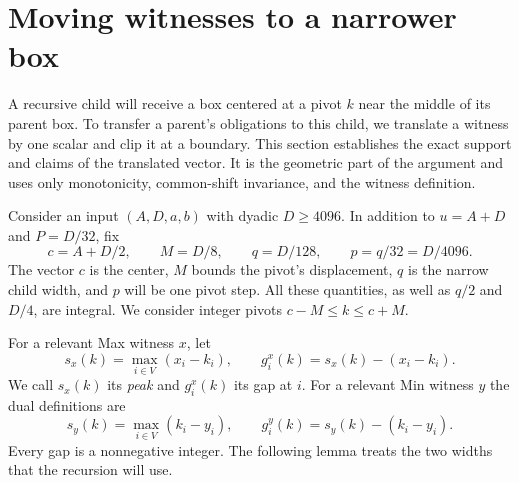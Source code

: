 \section{Moving witnesses to a narrower box}
\label{sec:translations}

A recursive child will receive a box centered at a pivot $k$ near the
middle of its parent box. To transfer a parent's obligations to this
child, we translate a witness by one scalar and clip it at a boundary.
This section establishes the exact support and claims of the
translated vector. It is the geometric part of the argument and uses
only monotonicity, common-shift invariance, and the witness definition.

Consider an input $(A,D,a,b)$ with dyadic $D\ge4096$. In addition
to $u=A+D$ and $P=D/32$, fix
\begin{equation}
 c=A+D/2,\qquad M=D/8,\qquad q=D/128,\qquad
 p=q/32=D/4096.
 \label{eq:pivot-parameters}
\end{equation}
The vector $c$ is the center, $M$ bounds the pivot's displacement,
$q$ is the narrow child width, and $p$ will be one pivot step. All
these quantities, as well as $q/2$ and $D/4$, are integral. We
consider integer pivots $c-M\le k\le c+M$.

For a relevant Max witness $x$, let
\begin{equation}
 s_x(k)=\max_{i\in V}(x_i-k_i),\qquad
 g_i^x(k)=s_x(k)-(x_i-k_i).
 \label{eq:max-gaps}
\end{equation}
We call $s_x(k)$ its \emph{peak} and $g_i^x(k)$ its gap at $i$.
For a relevant Min witness $y$ the dual definitions are
\begin{equation}
 s_y(k)=\max_{i\in V}(k_i-y_i),\qquad
 g_i^y(k)=s_y(k)-(k_i-y_i).
 \label{eq:min-gaps}
\end{equation}
Every gap is a nonnegative integer. The following lemma treats the
two widths that the recursion will use.

